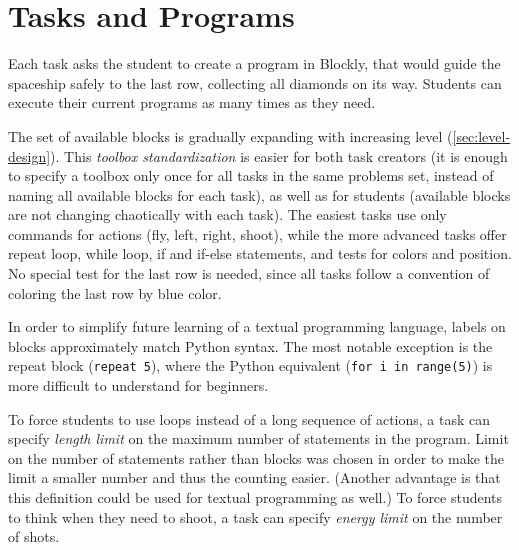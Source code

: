 \section{Tasks and Programs}
\label{sec:robomission.programs}

Each task asks the student to create a program in Blockly,
that would guide the spaceship safely to the last row,
collecting all diamonds on its way. %
Students can execute their current programs as many times
as they need. %

The set of available blocks is gradually expanding with
increasing level (\cref{sec:level-design}). This \emph{toolbox standardization}
is easier for both task creators (it is enough to specify
a toolbox only once for all tasks in the same problems set,
instead of naming all available blocks for each task),
as well as for  students
(available blocks are not changing chaotically with each task).
The easiest tasks use only commands for actions (fly, left, right, shoot),
while the more advanced tasks offer repeat loop, while loop, if and if-else statements,
and tests for colors and position.
No special test for the last row is needed, since all tasks follow a convention
of coloring the last row by blue color.

In order to simplify future learning of a textual programming language,
labels on blocks approximately match Python syntax. %
The most notable exception is the repeat block (\texttt{repeat 5}),
where the Python equivalent (\texttt{for i in range(5)}) is more difficult
to understand for beginners.

To force students to use loops instead of a long sequence of actions,
a task can specify \emph{length limit}
on the maximum number of statements in the program.
Limit on the number of statements rather than blocks was chosen in
order to make the limit a smaller number and thus the counting easier.
(Another advantage is that this definition could be used for textual
programming as well.)
To force students to think when they need to shoot, a task can specify
\emph{energy limit} on the number of shots.

